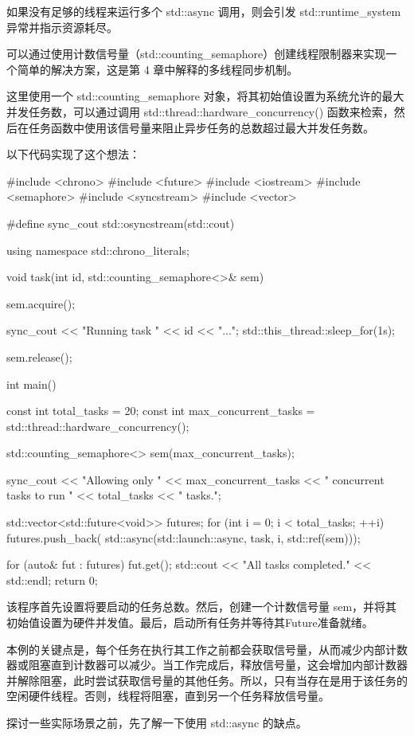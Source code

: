 如果没有足够的线程来运行多个 std::async 调用，则会引发 std::runtime\_system异常并指示资源耗尽。

可以通过使用计数信号量（std::counting\_semaphore）创建线程限制器来实现一个简单的解决方案，这是第 4 章中解释的多线程同步机制。

这里使用一个 std::counting\_semaphore 对象，将其初始值设置为系统允许的最大并发任务数，可以通过调用 std::thread::hardware\_concurrency() 函数来检索，然后在任务函数中使用该信号量来阻止异步任务的总数超过最大并发任务数。

以下代码实现了这个想法：

\begin{cpp}
#include <chrono>
#include <future>
#include <iostream>
#include <semaphore>
#include <syncstream>
#include <vector>

#define sync_cout std::osyncstream(std::cout)

using namespace std::chrono_literals;

void task(int id, std::counting_semaphore<>& sem) {
    sem.acquire();

    sync_cout << "Running task " << id << "...\n";
    std::this_thread::sleep_for(1s);

    sem.release();
}

int main() {
    const int total_tasks = 20;
    const int max_concurrent_tasks =
              std::thread::hardware_concurrency();

    std::counting_semaphore<> sem(max_concurrent_tasks);

    sync_cout << "Allowing only "
              << max_concurrent_tasks
              << " concurrent tasks to run "
              << total_tasks << " tasks.\n";

    std::vector<std::future<void>> futures;
    for (int i = 0; i < total_tasks; ++i) {
        futures.push_back(
            std::async(std::launch::async,
                task, i, std::ref(sem)));
    }

    for (auto& fut : futures) {
        fut.get();
    }
    std::cout << "All tasks completed." << std::endl;
    return 0;
}
\end{cpp}

该程序首先设置将要启动的任务总数。然后，创建一个计数信号量 sem，并将其初始值设置为硬件并发值。最后，启动所有任务并等待其Future准备就绪。

本例的关键点是，每个任务在执行其工作之前都会获取信号量，从而减少内部计数器或阻塞直到计数器可以减少。当工作完成后，释放信号量，这会增加内部计数器并解除阻塞，此时尝试获取信号量的其他任务。所以，只有当存在是用于该任务的空闲硬件线程。否则，线程将阻塞，直到另一个任务释放信号量。

探讨一些实际场景之前，先了解一下使用 std::async 的缺点。






